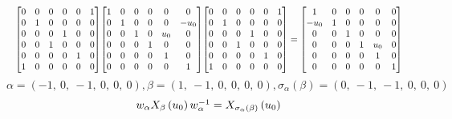 \documentclass[11pt]{article}
\theoremstyle{definition}
\begin{document}
\[
\scaletoalign{\textwidth}{{\left[\begin{matrix}0 & 0 & 0 & 0 & 0 & 1\\0 & 1 & 0 & 0 & 0 & 0\\0 & 0 & 0 & 1 & 0 & 0\\0 & 0 & 1 & 0 & 0 & 0\\0 & 0 & 0 & 0 & 1 & 0\\1 & 0 & 0 & 0 & 0 & 0\end{matrix}\right]} {\left[\begin{matrix}1 & 0 & 0 & 0 & 0 & 0\\0 & 1 & 0 & 0 & 0 & - u_{0}\\0 & 0 & 1 & 0 & u_{0} & 0\\0 & 0 & 0 & 1 & 0 & 0\\0 & 0 & 0 & 0 & 1 & 0\\0 & 0 & 0 & 0 & 0 & 1\end{matrix}\right]} {\left[\begin{matrix}0 & 0 & 0 & 0 & 0 & 1\\0 & 1 & 0 & 0 & 0 & 0\\0 & 0 & 0 & 1 & 0 & 0\\0 & 0 & 1 & 0 & 0 & 0\\0 & 0 & 0 & 0 & 1 & 0\\1 & 0 & 0 & 0 & 0 & 0\end{matrix}\right]} = {\left[\begin{matrix}1 & 0 & 0 & 0 & 0 & 0\\- u_{0} & 1 & 0 & 0 & 0 & 0\\0 & 0 & 1 & 0 & 0 & 0\\0 & 0 & 0 & 1 & u_{0} & 0\\0 & 0 & 0 & 0 & 1 & 0\\0 & 0 & 0 & 0 & 0 & 1\end{matrix}\right]}}
\]
\[
\alpha = \left( -1, \  0, \  -1, \  0, \  0, \  0\right), \beta = \left( 1, \  -1, \  0, \  0, \  0, \  0\right), \sigma_{\alpha}(\beta) = \left( 0, \  -1, \  -1, \  0, \  0, \  0\right)
\]
\[
\scaletoalign{\textwidth}{w_{\alpha} X_{\beta}\left(u_{0}\right) w_{\alpha}^{-1} = X_{\sigma_{\alpha}\left(\beta\right)}\left(u_{0}\right)}
\]
\end{document}
